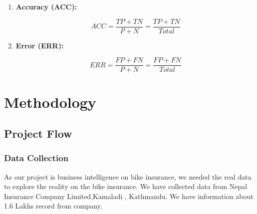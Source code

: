 \begin{enumerate}
\item \textbf{Accuracy (ACC):}
\par $$ACC = \frac{TP+TN}{P+N} =\frac{TP+TN}{Total}$$

\item \textbf{Error (ERR):}
\par $$ERR = \frac{FP+FN}{P+N} =\frac{FP+FN}{Total}$$
%

%
%
 
%
%


\end{enumerate}




\chapter{Methodology}
\section{Project Flow}
\subsection{Data Collection}
As our project is business intelligence on bike insurance, we needed the real data to explore the reality on the bike insurance. We have collected data from Nepal Insurance Company Limited,Kamaladi , Kathmandu.\cite{data2017} We have information about 1.6 Lakhs record from company.
